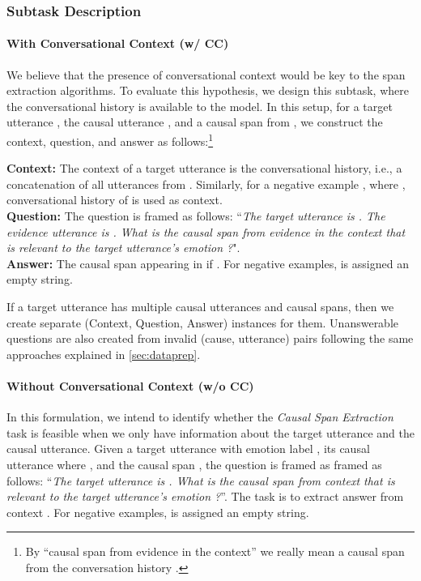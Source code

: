 \documentclass[11pt,a4paper]{article}
\theoremstyle{definition}
\begin{document}
\subsubsection{Subtask Description}









\paragraph{With Conversational Context (w/ CC)} We 
believe
that the presence of conversational context would be key to the span extraction algorithms. To evaluate this hypothesis, we design this subtask, where the conversational history is available to the model. In this setup, for a target utterance , the causal utterance , and a causal span  from , we construct the context, question, and answer as follows:\footnote{By ``causal span from evidence in the context'' we really mean a causal span from the conversation history .}

\noindent \textbf{Context:} The context of a target utterance  is the conversational history, i.e., a concatenation of all utterances from .
Similarly, for a negative example , where , conversational history of  is used as context.\\
\textbf{Question:} The question is framed as follows: ``\textit{The target utterance is . The evidence utterance is . What is the causal span from evidence in the context that is relevant to the target utterance's emotion ?}".\\
\textbf{Answer:} The causal span  appearing in  if . For negative examples,  is assigned an empty string. 

If a target utterance has multiple causal utterances and causal spans, then we create separate (Context, Question, Answer) instances for them. Unanswerable questions are also created from invalid (cause, utterance) pairs following the same approaches explained in \cref{sec:dataprep}. 

\paragraph{Without Conversational Context (w/o CC)}
In this formulation, we intend to identify whether the \textit{Causal Span Extraction} task is feasible when we only have information about the target utterance and the causal utterance. Given a target utterance  with emotion label , its causal utterance  where , and the causal span , the question is framed as framed as follows: ``\textit{The target utterance is . What is the causal span from context that is relevant to the target utterance's emotion ?}''. The task is to extract answer  from context . For negative examples,  is assigned an empty string.
\end{document}
